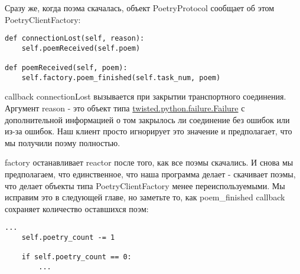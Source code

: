 Сразу же, когда поэма скачалась, объект PoetryProtocol сообщает 
об этом PoetryClientFactory:

 \begin{verbatim}
def connectionLost(self, reason):
    self.poemReceived(self.poem)

def poemReceived(self, poem):
    self.factory.poem_finished(self.task_num, poem)
\end{verbatim} 


callback connectionLost вызывается при закрытии транспортного соединения. 
Аргумент reason - это объект типа 
\href{http://twistedmatrix.com/trac/browser/tags/releases/twisted-8.2.0/twisted/python/failure.py}{twisted.python.failure.Failure} 
с дополнительной информацией о том закрылось ли соединение без ошибок 
или из-за ошибок. Наш клиент просто игнорирует это значение и предполагает, 
что мы получили поэму полностью.


factory останавливает reactor после того, как все поэмы скачались. 
И снова мы предполагаем, что единственное, что наша программа 
делает - скачивает поэмы, что делает объекты типа PoetryClientFactory 
менее переиспользуемыми. Мы исправим это в следующей главе, но заметьте 
то, как poem\_finished callback сохраняет количество оставшихся поэм:

 \begin{verbatim}
...
    self.poetry_count -= 1

    if self.poetry_count == 0:
        ...
\end{verbatim} 


